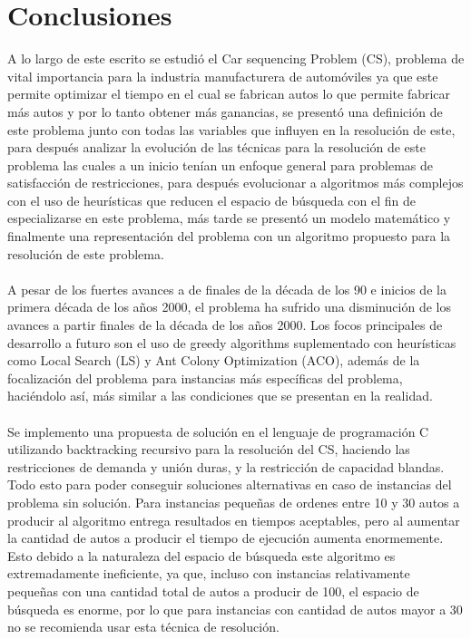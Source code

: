 \documentclass[letter, 10pt]{article}
\begin{document}
\section{Conclusiones}
A lo largo de este escrito se estudi\'o el Car sequencing Problem (CS), problema de vital importancia para la industria manufacturera de autom\'oviles ya que este permite optimizar el tiempo en el cual se fabrican autos lo que permite fabricar m\'as autos y por lo tanto obtener m\'as ganancias, se present\'o una definici\'on de este problema junto con todas las variables que influyen en la resoluci\'on de este, para despu\'es analizar la evoluci\'on de las t\'ecnicas para la resoluci\'on de este problema las cuales a un inicio ten\'ian un enfoque general para problemas de satisfacci\'on de restricciones, para despu\'es evolucionar a algoritmos m\'as complejos con el uso de heur\'isticas que reducen el espacio de b\'usqueda con el fin de especializarse en este problema, m\'as tarde se present\'o un modelo matem\'atico y finalmente una representaci\'on del problema con un algoritmo propuesto para la resoluci\'on de este problema.\\\\
A pesar de los fuertes avances a de finales de la d\'ecada de los 90 e inicios de la primera d\'ecada de los a\~{n}os 2000, el problema ha sufrido una disminuci\'on de los avances a partir finales de la d\'ecada de los a\~{n}os 2000. Los focos principales de desarrollo a futuro son el uso de greedy algorithms suplementado con heur\'isticas como Local Search (LS) y Ant Colony Optimization (ACO), adem\'as de la focalizaci\'on del problema para instancias m\'as espec\'ificas del problema, haci\'endolo as\'i, m\'as similar a las condiciones que se presentan en la realidad.\\\\
Se implemento una propuesta de soluci\'on en el lenguaje de programaci\'on C utilizando backtracking recursivo para la resoluci\'on del CS, haciendo las restricciones de demanda y uni\'on duras, y la restricci\'on de capacidad blandas. Todo esto para poder conseguir soluciones alternativas en caso de instancias del problema sin soluci\'on. Para instancias peque\~{n}as de ordenes entre 10 y 30 autos a producir al algoritmo entrega resultados en tiempos aceptables, pero al aumentar la cantidad de autos a producir el tiempo de ejecuci\'on aumenta enormemente. Esto debido a la naturaleza del espacio de b\'usqueda este algoritmo es extremadamente ineficiente, ya que, incluso con instancias relativamente peque\~{n}as con una cantidad total de autos a producir de 100, el espacio de b\'usqueda es enorme, por lo que para instancias con cantidad de autos mayor a 30 no se recomienda usar esta t\'ecnica de resoluci\'on.\\\\
\end{document}

